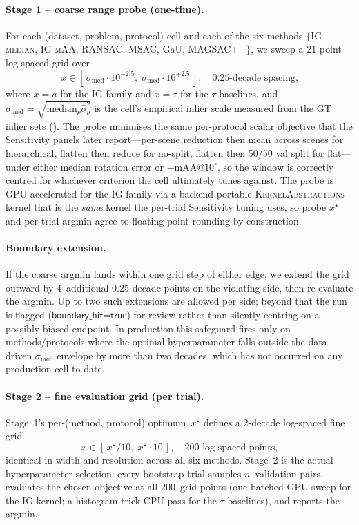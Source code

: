 \documentclass{article}
\newcommand{\mname}[1]{\texorpdfstring{#1\xspace}{#1}}
\newcommand{\pp}{\nolinebreak[4]\hspace{-0.05em}+\nolinebreak[4]\hspace{-0.05em}+}
\newcommand{\ransac}{\mname{RANSAC}}
\newcommand{\msac}{\mname{MSAC}}
\newcommand{\magsacpp}{\texorpdfstring{MAGSAC\pp\xspace}{MAGSAC++}}
\newcommand{\gau}{\mname{GaU}}
\begin{document}
	\paragraph{Stage 1 -- coarse range probe (one-time).}
	For each (dataset, problem, protocol) cell and each of the six
	methods $\{$\textsc{IG-median}, \textsc{IG-mAA},
	\ransac, \msac, \gau,
	\magsacpp$\}$, we sweep a 21-point log-spaced grid over
	\begin{equation*}
		x \in [\,\sigma_{\mathrm{med}}\!\cdot\!10^{-2.5},\;
		\sigma_{\mathrm{med}}\!\cdot\!10^{+2.5}\,],
		\quad \text{$0.25$-decade spacing,}
	\end{equation*}
	where $x = a$ for the IG family and $x = \tau$ for the
	$\tau$-baselines, and
	$\sigma_{\mathrm{med}} = \sqrt{\mathrm{median}_p
			\hat\sigma^2_p}$ is the cell's empirical inlier scale measured
	from the GT inlier sets
	().  The probe minimises the
	same per-protocol scalar objective that the Sensitivity
	panels later report---per-scene reduction then
	mean across scenes for hierarchical, flatten then reduce for
	no-split, flatten then 50/50 val split for flat---under either
	median rotation error or $-\mathrm{mAA}@10^\circ$, so the
	window is correctly centred for whichever criterion the cell
	ultimately tunes against.  The probe is GPU-accelerated for
	the IG family via a backend-portable
	\textsc{KernelAbstractions} kernel that is the \emph{same}
	kernel the per-trial Sensitivity tuning uses, so probe
	$x^\star$ and per-trial argmin agree to floating-point
	rounding by construction.

	\paragraph{Boundary extension.}
	If the coarse argmin lands within one grid step of either
	edge, we extend the grid outward by $4$~additional
	$0.25$-decade points on the violating side, then re-evaluate
	the argmin.  Up to two such extensions are allowed per side;
	beyond that the run is flagged ($\textsf{boundary\_hit{=}true}$)
	for review rather than silently centring on a possibly biased
	endpoint.  In production this safeguard fires only on
	methods/protocols where the optimal hyperparameter falls
	outside the data-driven $\sigma_{\mathrm{med}}$ envelope by
	more than two decades, which has not occurred on any
	production cell to date.

	\paragraph{Stage 2 -- fine evaluation grid (per trial).}
	Stage~1's per-(method, protocol) optimum~$x^\star$ defines a
	$2$-decade log-spaced fine grid
	\begin{equation*}
		x \in [\,x^\star/10,\; x^\star\cdot 10\,],
		\quad \text{$200$~log-spaced points,}
	\end{equation*}
	identical in width and resolution across all six methods.
	Stage~2 is the actual hyperparameter selection: every
	bootstrap trial samples $n$~validation pairs, evaluates the
	chosen objective at all $200$~grid points (one batched GPU
	sweep for the IG kernel; a histogram-trick CPU pass for the
	$\tau$-baselines), and reports the argmin.
\end{document}
